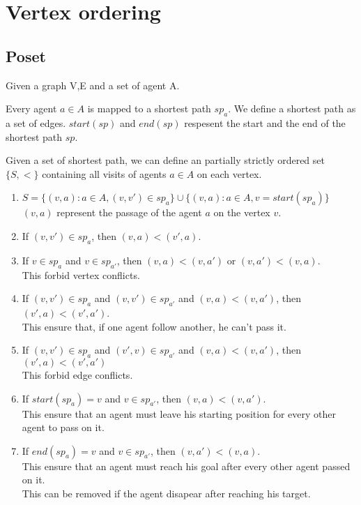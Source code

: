 \section{Vertex ordering}\label{sec:vo}

\subsection{Poset}

Given a graph {V,E} and a set of agent {A}.

Every agent $a \in A$ is mapped to a shortest path $sp_a$.
We define a shortest path as a set of edges. 
$start(sp)$ and $end(sp)$ respesent the start and the end of the shortest path $sp$.

Given a set of shortest path, we can define an partially strictly ordered set $\{S,<\}$
containing all visits of agents $a \in A$ on each vertex.

\begin{enumerate}
  \item $S = \{(v,a) : a \in A, (v,v') \in sp_a\} \cup \{(v,a) : a \in A, v=start(sp_a)\}$
  \\ $(v,a)$ represent the passage of the agent $a$ on the vertex $v$.
  \item If $(v,v') \in sp_a$, then $(v,a)<(v',a)$.\label{succ}
  \item If $v \in sp_a$ and $v \in sp_{a'}$, then $(v,a)<(v,a')$ or $(v,a')<(v,a)$.
  \\ This forbid vertex conflicts.\label{vercon}
  \item If $(v,v') \in sp_a$ and $(v,v') \in sp_{a'}$ and $(v,a)<(v,a')$, then $(v',a)<(v',a')$.
  \\ This ensure that, if one agent follow another, he can't pass it.
  \item If $(v,v') \in sp_a$ and $(v',v) \in sp_{a'}$ and $(v,a)<(v,a')$, then $(v',a)<(v',a')$
  \\ This forbid edge conflicts.\label{edgcon}
  \item If $start(sp_a)=v$ and $v \in sp_{a'}$, then $(v,a)<(v,a')$.
  \\ This ensure that an agent must leave his starting position for every other agent to pass on it.
  \item If $end(sp_a)=v$ and $v \in sp_{a'}$, then $(v,a')<(v,a)$.
  \\ This ensure that an agent must reach his goal after every other agent passed on it.
  \\ This can be removed if the agent disapear after reaching his target.
\end{enumerate}

